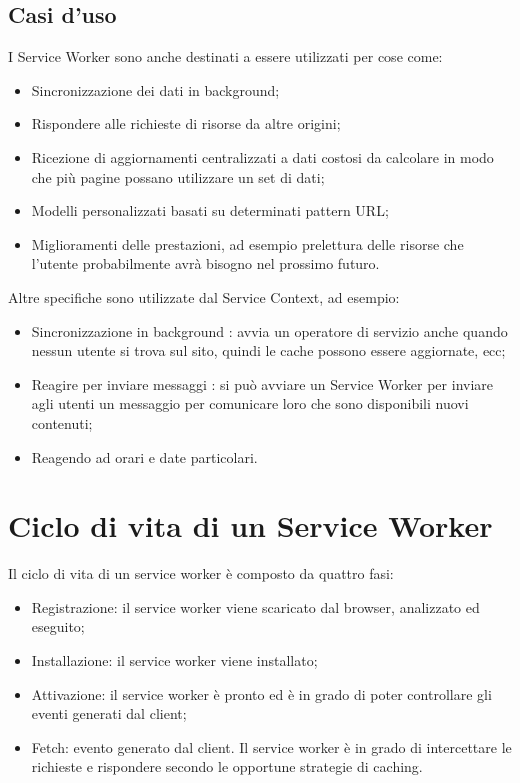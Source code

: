 \documentclass[italian]{article}
\begin{document}
\subsection{Casi d'uso}
I Service Worker sono anche destinati a essere utilizzati per cose come:
\begin{itemize}
	\item Sincronizzazione dei dati in background;
	\item Rispondere alle richieste di risorse da altre origini;
	\item Ricezione di aggiornamenti centralizzati a dati costosi da calcolare in modo che più pagine possano utilizzare un set di dati;
	\item Modelli personalizzati basati su determinati pattern URL;
	\item Miglioramenti delle prestazioni, ad esempio prelettura delle risorse che l'utente probabilmente avrà bisogno nel prossimo futuro.
\end{itemize}
Altre specifiche sono utilizzate dal Service Context, ad esempio:
\begin{itemize}
	\item Sincronizzazione in background : avvia un operatore di servizio anche quando nessun utente si trova sul sito, quindi le cache possono essere aggiornate, ecc;
	\item Reagire per inviare messaggi : si può avviare un Service Worker per inviare agli utenti un messaggio per comunicare loro che sono disponibili nuovi contenuti;
	\item Reagendo ad orari e date particolari.
\end{itemize}

\section{Ciclo di vita di un Service Worker}
Il ciclo di vita di un service worker è composto da quattro fasi:
\begin{itemize}
\item Registrazione: il service worker viene scaricato dal browser, analizzato ed eseguito;
\item Installazione: il service worker viene installato;
\item Attivazione: il service worker è pronto ed è in grado di poter controllare gli eventi generati dal client;
\item Fetch: evento generato dal client. Il service worker è in grado di intercettare le richieste e rispondere secondo le opportune strategie di caching. 
\end{itemize}
\end{document}
